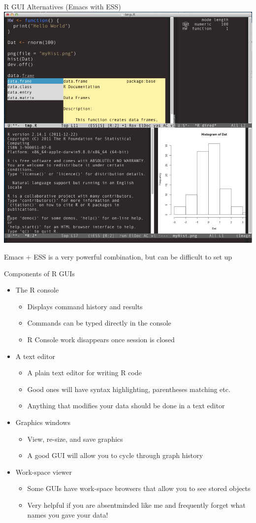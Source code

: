\documentclass[table,smaller]{beamer}
\begin{document}
\begin{frame}[label=sec-2-4]{R GUI Alternatives (Emacs with ESS)}
\includegraphics[width=.65\textwidth]{images/emacs.png}

Emacs + ESS is a very powerful combination, but can be difficult to set up
\end{frame}

\begin{frame}[label=sec-2-5]{Components of R GUIs}
\begin{itemize}
\item The R console
\begin{itemize}
\item Displays command history and results
\item Commands can be typed directly in the console
\item R Console work disappears once session is closed
\end{itemize}

\item A text editor
\begin{itemize}
\item A plain text editor for writing R code
\item Good ones will have syntax highlighting, parentheses matching etc.
\item Anything that modifies your data should be done in a text editor
\end{itemize}

\item Graphics windows
\begin{itemize}
\item View, re-size, and save graphics
\item A good GUI will allow you to cycle through graph history
\end{itemize}

\item Work-space viewer
\begin{itemize}
\item Some GUIs have work-space browsers that allow you to see stored objects
\item Very helpful if you are absentminded like me and frequently forget what names you gave your data!
\end{itemize}
\end{itemize}
\end{frame}
\end{document}
